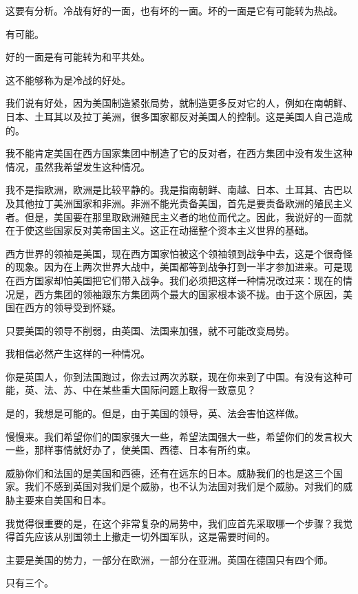 这要有分析。冷战有好的一面，也有坏的一面。坏的一面是它有可能转为热战。

有可能。

好的一面是有可能转为和平共处。

这不能够称为是冷战的好处。

我们说有好处，因为美国制造紧张局势，就制造更多反对它的人，例如在南朝鲜、日本、土耳其以及拉丁美洲，很多国家都反对美国人的控制。这是美国人自己造成的。

我不能肯定美国在西方国家集团中制造了它的反对者，在西方集团中没有发生这种情况，虽然我希望发生这种情况。

我不是指欧洲，欧洲是比较平静的。我是指南朝鲜、南越、日本、土耳其、古巴以及其他拉丁美洲国家和非洲。非洲不能光责备美国，首先是要责备欧洲的殖民主义者。但是，美国要在那里取欧洲殖民主义者的地位而代之。因此，我说好的一面就在于使这些国家反对美帝国主义。这正在动摇整个资本主义世界的基础。

西方世界的领袖是美国，现在西方国家怕被这个领袖领到战争中去，这是个很奇怪的现象。因为在上两次世界大战中，美国都等到战争打到一半才参加进来。可是现在西方国家却怕美国把它们带入战争。我们必须把这样一种情况改过来：现在的情况是，西方集团的领袖跟东方集团两个最大的国家根本谈不拢。由于这个原因，美国在西方的领导受到怀疑。

只要美国的领导不削弱，由英国、法国来加强，就不可能改变局势。

我相信必然产生这样的一种情况。

你是英国人，你到法国跑过，你去过两次苏联，现在你来到了中国。有没有这种可能，英、法、苏、中在某些重大国际问题上取得一致意见？

是的，我想是可能的。但是，由于美国的领导，英、法会害怕这样做。

慢慢来。我们希望你们的国家强大一些，希望法国强大一些，希望你们的发言权大一些，那样事情就好办了，使美国、西德、日本有所约束。

威胁你们和法国的是美国和西德，还有在远东的日本。威胁我们的也是这三个国家。我们不感到英国对我们是个威胁，也不认为法国对我们是个威胁。对我们的威胁主要来自美国和日本。

我觉得很重要的是，在这个非常复杂的局势中，我们应首先采取哪一个步骤？我觉得首先应该从别国领土上撤走一切外国军队，这是需要时间的。

主要是美国的势力，一部分在欧洲，一部分在亚洲。英国在德国只有四个师。

只有三个。

